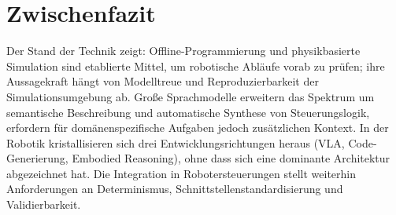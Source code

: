 \section*{Zwischenfazit}

Der Stand der Technik zeigt: Offline-Programmierung und physikbasierte
Simulation sind etablierte Mittel, um robotische Abläufe vorab zu prüfen; ihre
Aussagekraft hängt von Modelltreue und Reproduzierbarkeit der
Simulationsumgebung ab. Große Sprachmodelle erweitern das Spektrum um
semantische Beschreibung und automatische Synthese von Steuerungslogik,
erfordern für domänenspezifische Aufgaben jedoch zusätzlichen Kontext. In der
Robotik kristallisieren sich drei Entwicklungsrichtungen heraus (VLA,
Code-Generierung, Embodied Reasoning), ohne dass sich eine dominante Architektur
abgezeichnet hat. Die Integration in Robotersteuerungen stellt weiterhin
Anforderungen an Determinismus, Schnittstellenstandardisierung und
Validierbarkeit.



